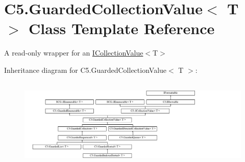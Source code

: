 \hypertarget{class_c5_1_1_guarded_collection_value}{}\section{C5.\+Guarded\+Collection\+Value$<$ T $>$ Class Template Reference}
\label{class_c5_1_1_guarded_collection_value}


A read-\/only wrapper for an \hyperlink{interface_c5_1_1_i_collection_value}{I\+Collection\+Value}$<$T$>$  


Inheritance diagram for C5.\+Guarded\+Collection\+Value$<$ T $>$\+:\begin{figure}[H]
\begin{center}
\leavevmode
\includegraphics[height=4.357976cm]{class_c5_1_1_guarded_collection_value}
\end{center}
\end{figure}
